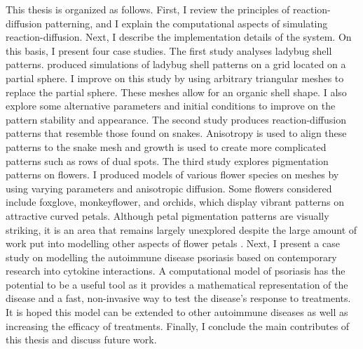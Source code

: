 This thesis is organized as follows. First, I review the principles of reaction-diffusion patterning, and I explain the computational aspects of simulating reaction-diffusion. Next, I describe the implementation details of the \ProgramName{} system. On this basis, I present four case studies. The first study analyses ladybug shell patterns. \citet{liaw2001} produced simulations of ladybug shell patterns on a grid located on a partial sphere. I improve on this study by using arbitrary triangular meshes to replace the partial sphere. These meshes allow for an organic shell shape. I also explore some alternative parameters and initial conditions to improve on the pattern stability and appearance. The second study produces reaction-diffusion patterns that resemble those found on snakes. Anisotropy is used to align these patterns to the snake mesh and growth is used to create more complicated patterns such as rows of dual spots. The third study explores pigmentation patterns on flowers. I produced models of various flower species on meshes by using varying parameters and anisotropic diffusion. Some flowers considered include foxglove, monkeyflower, and orchids, which display vibrant patterns on attractive curved petals. Although petal pigmentation patterns are visually striking, it is an area that remains largely unexplored despite the large amount of work put into modelling other aspects of flower petals \citep{owens2016}. Next, I present a case study on modelling the autoimmune disease psoriasis based on contemporary research into cytokine interactions. A computational model of psoriasis has the potential to be a useful tool as it provides a mathematical representation of the disease and a fast, non-invasive way to test the disease's response to treatments. It is hoped this model can be extended to other autoimmune diseases as well as increasing the efficacy of treatments. Finally, I conclude the main contributes of this thesis and discuss future work.